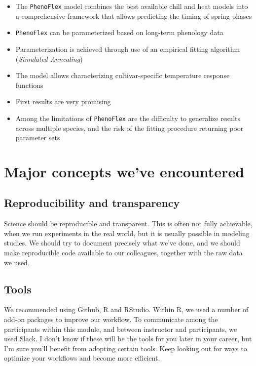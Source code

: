 \documentclass[
]{book}
\providecommand{\tightlist}{%
  \setlength{\itemsep}{0pt}\setlength{\parskip}{0pt}}
\begin{document}
\begin{itemize}
\tightlist
\item
  The \texttt{PhenoFlex} model combines the best available chill and heat models into a comprehensive framework that allows predicting the timing of spring phases
\item
  \texttt{PhenoFlex} can be parameterized based on long-term phenology data
\item
  Parameterization is achieved through use of an empirical fitting algorithm (\emph{Simulated Annealing})
\item
  The model allows characterizing cultivar-specific temperature response functions
\item
  First results are very promising
\item
  Among the limitations of \texttt{PhenoFlex} are the difficulty to generalize results across multiple species, and the risk of the fitting procedure returning poor parameter sets
\end{itemize}

\hypertarget{major-concepts-weve-encountered}{%
\section{Major concepts we've encountered}\label{major-concepts-weve-encountered}}

\hypertarget{reproducibility-and-transparency}{%
\subsection{Reproducibility and transparency}\label{reproducibility-and-transparency}}

Science should be reproducible and transparent. This is often not fully achievable, when we run experiments in the real world, but it is usually possible in modeling studies. We should try to document precisely what we've done, and we should make reproducible code available to our colleagues, together with the raw data we used.

\hypertarget{tools}{%
\subsection{Tools}\label{tools}}

We recommended using Github, R and RStudio. Within R, we used a number of add-on packages to improve our workflow. To communicate among the participants within this module, and between instructor and participants, we used Slack. I don't know if these will be the tools for you later in your career, but I'm sure you'll benefit from adopting certain tools. Keep looking out for ways to optimize your workflows and become more efficient.
\end{document}
